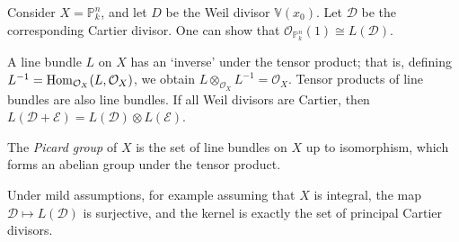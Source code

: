Consider \( X = \mathbb P^n_k \), and let \( D \) be the Weil divisor \( \mathbb V(x_0) \).
Let \( \mathcal D \) be the corresponding Cartier divisor.
One can show that \( \mathcal O_{\mathbb P^n_k}(1) \cong L(\mathcal D) \).
\begin{remark}
    A line bundle \( L \) on \( X \) has an `inverse' under the tensor product; that is, defining \( L^{-1} = \operatorname{Hom}_{\mathcal O_X}(L, \mathcal O_X) \), we obtain \( L \otimes_{\mathcal O_X} L^{-1} = \mathcal O_X \).
    Tensor products of line bundles are also line bundles.
    If all Weil divisors are Cartier, then \( L(\mathcal D + \mathcal E) = L(\mathcal D) \otimes L(\mathcal E) \).
\end{remark}
\begin{definition}
    The \emph{Picard group} of \( X \) is the set of line bundles on \( X \) up to isomorphism, which forms an abelian group under the tensor product.
\end{definition}
Under mild assumptions, for example assuming that \( X \) is integral, the map \( \mathcal D \mapsto L(\mathcal D) \) is surjective, and the kernel is exactly the set of principal Cartier divisors.
